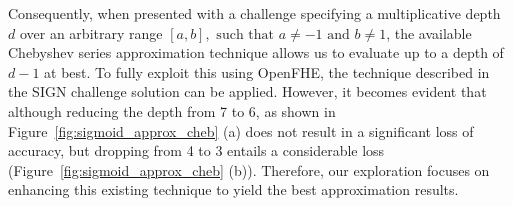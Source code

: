 \documentclass[journal=tosc,final]{iacrtrans}
\begin{document}
Consequently, when presented with a challenge specifying a multiplicative depth $d$ over an arbitrary range $[a,b],\text{ such that } a\neq-1\text{ and }b\neq1 $, the available Chebyshev series approximation technique allows us to evaluate up to a depth of $d-1$ at best. To fully exploit this using OpenFHE, the technique described in the SIGN challenge solution can be applied. However, it becomes evident that although reducing the depth from 7 to 6, as shown in Figure~\ref{fig:sigmoid_approx_cheb} (a) does not result in a significant loss of accuracy, but dropping from 4 to 3 entails a considerable loss (Figure~\ref{fig:sigmoid_approx_cheb} (b)). Therefore, our exploration focuses on enhancing this existing technique to yield the best approximation results.




\end{document}

